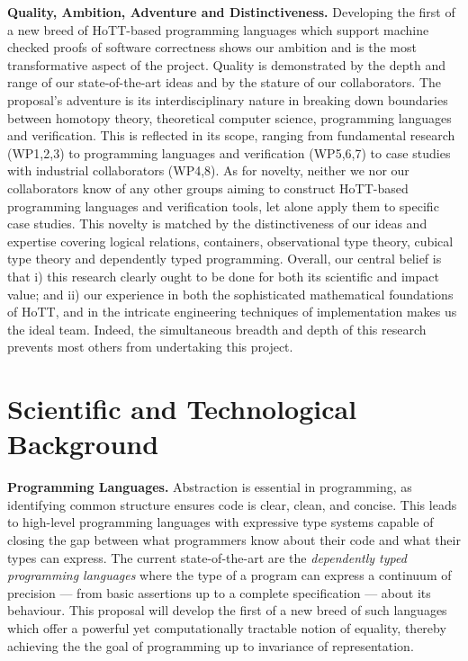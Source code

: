 \documentclass[a4paper,11pt]{article}
\begin{document}
  {\bf Quality, Ambition, Adventure and Distinctiveness.}  Developing
  the first of a new breed of HoTT-based programming languages which
  support machine checked proofs of software correctness shows our
  ambition and is the most transformative aspect of the
  project. Quality is demonstrated by the depth and range of our
  state-of-the-art ideas and by the stature of our collaborators. The
  proposal's adventure is its interdisciplinary nature in breaking
  down boundaries between homotopy theory, theoretical computer
  science, programming languages and verification. This is reflected
  in its scope, ranging from fundamental research (WP1,2,3) to
  programming languages and verification (WP5,6,7) to case studies
  with industrial collaborators (WP4,8). As for novelty, neither we
  nor our collaborators know of any other groups aiming to construct
  HoTT-based programming languages and verification tools, let alone
  apply them to specific case studies. This novelty is matched by the
  distinctiveness of our ideas and expertise covering logical
  relations, containers, observational type theory, cubical type
  theory and dependently typed programming.  Overall, our central
  belief is that i) this research clearly ought to be done for both
  its scientific and impact value; and ii) our experience in both the
  sophisticated mathematical foundations of HoTT, and in the intricate
  engineering techniques of implementation makes us the ideal team.
  Indeed, the simultaneous breadth and depth of this research prevents
  most others from undertaking this project.

\vspace*{-0.1in} 
\vspace*{-0.1in} 
\section{Scientific and Technological Background}
\vspace*{-0.1in} 

{\bf Programming Languages.} Abstraction is essential in programming,
as identifying common structure ensures code is clear, clean, and
concise. This leads to high-level programming languages with
expressive type systems capable of closing the gap between what
programmers know about their code and what their types can express.
The current state-of-the-art are the {\em dependently typed
  programming languages} where the type of a program can express a
continuum of precision --- from basic assertions up to a complete
specification --- about its behaviour. This proposal will develop the
first of a new breed of such languages which offer a powerful yet
computationally tractable notion of equality, thereby achieving the
the goal of programming up to invariance of representation.
\end{document}
